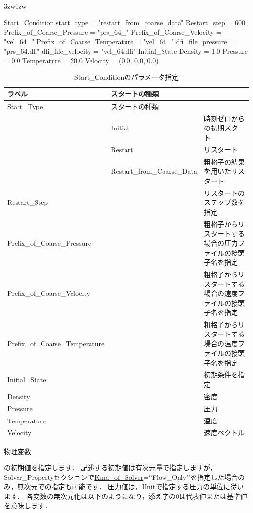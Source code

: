 \begin{indentation}{3zw}{0zw}

{\small
\begin{program}
  Start_Condition {
    start_type                   = "restart_from_coarse_data"
    Restart_step                 = 600
    Prefix_of_Coarse_Pressure    = "prs_64_"
    Prefix_of_Coarse_Velocity    = "vel_64_"
    Prefix_of_Coarse_Temperature = "vel_64_"
    dfi_file_pressure            = "prs_64.dfi"
    dfi_file_velocity            = "vel_64.dfi"
    Initial_State {
      Density     = 1.0
      Pressure    = 0.0
      Temperature = 20.0
      Velocity    = (0.0, 0.0, 0.0)
    }
  }
\end{program}
}


\begin{table}[htdp]
\caption{Start\_Conditionのパラメータ指定}
\begin{center}
\small
\begin{tabular}{lll} \toprule
ラベル & スタートの種類 & \\ \midrule
Start\_Type & スタートの種類 & \\
 & Initial & 時刻ゼロからの初期スタート\\
 & Restart & リスタート\\
 & Restart\_from\_Coarse\_Data & 粗格子の結果を用いたリスタート\\ \hline
Restart\_Step & & リスタートのステップ数を指定\\ \hline
Prefix\_of\_Coarse\_Pressure & & 粗格子からリスタートする場合の圧力ファイルの接頭子名を指定\\
Prefix\_of\_Coarse\_Velocity & & 粗格子からリスタートする場合の速度ファイルの接頭子名を指定\\
Prefix\_of\_Coarse\_Temperature & & 粗格子からリスタートする場合の温度ファイルの接頭子名を指定\\ \hline
Initial\_State & & 初期条件を指定\\
Density & & 密度\\
Pressure & & 圧力\\
Temperature & & 温度\\
Velocity & & 速度ベクトル\\ \bottomrule
\end{tabular}
\end{center}
\label{tbl:start}
\end{table}

\hypertarget{tgt:initial_state}{物理変数}の初期値を指定します．
記述する初期値は有次元量で指定しますが，Solver\_Propertyセクションで\hyperlink{tgt:solver_property}{Kind\_of\_Solver}=\lq\lq Flow\_Only\rq\rq を指定した場合のみ，無次元での指定も可能です．
圧力値は，\hyperlink{tgt:unit}{Unit}で指定する圧力の単位に従います．
各変数の無次元化は以下のようになり，添え字の0は代表値または基準値を意味します．


\end{indentation}
